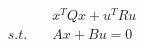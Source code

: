 \documentclass[preview]{standalone}
\begin{document}
\begin{align*}
\quad &x^TQx + u^T R u \\ s.t. \quad &Ax + Bu = 0
\end{align*}
\end{document}

